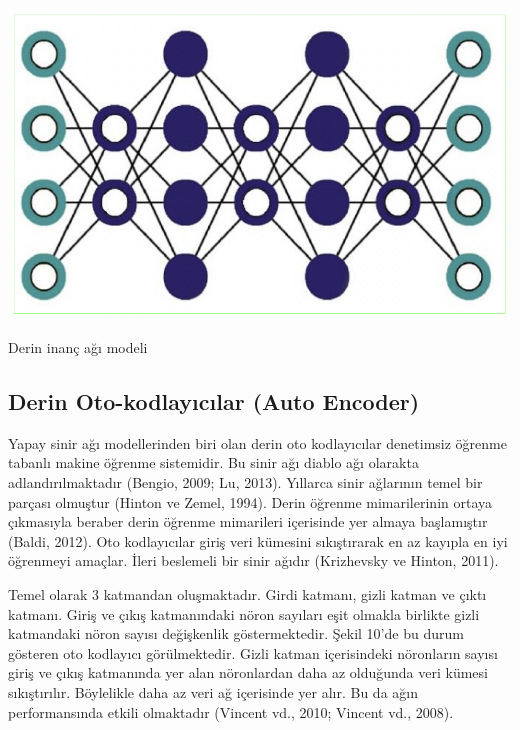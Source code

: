 \documentclass{article}
\begin{document}
\begin{multicols}{2}
\begin{minipage}{\linewidth}
    \includegraphics[width=0.8\linewidth]{inancagi.png} 
    \label{fig:Şekil 9}
\end{minipage}
\begin{center}
    Derin inanç ağı modeli \cite{ref5}
\end{center}


\subsection{Derin Oto-kodlayıcılar (Auto Encoder)}
Yapay sinir ağı modellerinden biri olan derin oto
kodlayıcılar denetimsiz öğrenme tabanlı makine
öğrenme sistemidir. Bu sinir ağı diablo ağı
olarakta adlandırılmaktadır (Bengio, 2009; Lu,
2013). Yıllarca sinir ağlarının temel bir parçası
olmuştur (Hinton ve Zemel, 1994). Derin
öğrenme mimarilerinin ortaya çıkmasıyla
beraber derin öğrenme mimarileri içerisinde yer
almaya başlamıştır (Baldi, 2012). Oto
kodlayıcılar giriş veri kümesini sıkıştırarak en az
kayıpla en iyi öğrenmeyi amaçlar. İleri beslemeli
bir sinir ağıdır (Krizhevsky ve Hinton, 2011).

Temel olarak 3 katmandan oluşmaktadır. Girdi
katmanı, gizli katman ve çıktı katmanı. Giriş ve
çıkış katmanındaki nöron sayıları eşit olmakla
birlikte gizli katmandaki nöron sayısı
değişkenlik göstermektedir. Şekil 10’de bu
durum gösteren oto kodlayıcı görülmektedir.
Gizli katman içerisindeki nöronların sayısı giriş
ve çıkış katmanında yer alan nöronlardan daha az
olduğunda veri kümesi sıkıştırılır. Böylelikle
daha az veri ağ içerisinde yer alır. Bu da ağın
performansında etkili olmaktadır (Vincent vd.,
2010; Vincent vd., 2008). 


\end{multicols}
\end{document}
